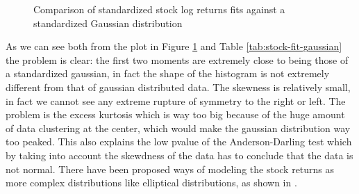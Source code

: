 \begin{table}[htb]
\centering
{}
\caption{Descriptive statics and results of fit of stock returns against a standardized Gaussian distribution.}
\label{tab:stock-fit-gaussian}
\end{table}

\begin{figure}[htb]
\centering

\caption{Comparison of standardized stock log returns fits against a standardized Gaussian distribution}
\label{fig:stock-returns-normal}
\end{figure}

As we can see both from the plot in Figure \ref{fig:stock-returns-normal} and Table \ref{tab:stock-fit-gaussian} the problem is clear: the first two moments are extremely close to being those of a standardized gaussian, in fact the shape of the histogram is not extremely different from that of gaussian distributed data. The skewness is relatively small, in fact we cannot see any extreme rupture of symmetry to the right or left. The problem is the excess kurtosis which is way too big because of the huge amount of data clustering at the center, which would make the gaussian distribution way too peaked. This also explains the low pvalue of the Anderson-Darling test which by taking into account the skewdness of the data has to conclude that the data is not normal. There have been proposed ways of modeling the stock returns as more complex distributions like elliptical distributions, as shown in \cite{risk-parity-hard}.



